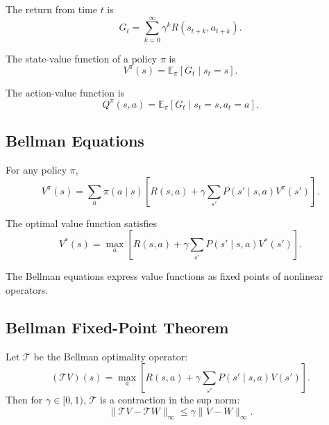 \begin{definition}[Return]
The return from time $t$ is
\[
G_t = \sum_{k=0}^{\infty} \gamma^k R(s_{t+k}, a_{t+k}).
\]
\end{definition}

\begin{definition}
The state-value function of a policy $\pi$ is
\[
V^\pi(s) = \mathbb{E}_\pi[G_t \mid s_t = s].
\]
\end{definition}

\begin{definition}
The action-value function is
\[
Q^\pi(s,a) = \mathbb{E}_\pi[G_t \mid s_t = s, a_t = a].
\]
\end{definition}

\subsection{Bellman Equations}

\begin{proposition}
For any policy $\pi$,
\[
V^\pi(s) = \sum_a \pi(a \mid s)
\left[
R(s,a) + \gamma \sum_{s'} P(s' \mid s,a) V^\pi(s')
\right].
\]
\end{proposition}

\begin{proposition}
The optimal value function satisfies
\[
V^*(s) = \max_a
\left[
R(s,a) + \gamma \sum_{s'} P(s' \mid s,a) V^*(s')
\right].
\]
\end{proposition}

\begin{remark}
The Bellman equations express value functions as fixed points of nonlinear operators.
\end{remark}

\subsection{Bellman Fixed-Point Theorem}

\begin{theorem}
Let $\mathcal{T}$ be the Bellman optimality operator:
\[
(\mathcal{T}V)(s)
= \max_a \left[ R(s,a) + \gamma \sum_{s'} P(s' \mid s,a) V(s') \right].
\]
Then for $\gamma \in [0,1)$, $\mathcal{T}$ is a contraction in the sup norm:
\[
\|\mathcal{T}V - \mathcal{T}W\|_\infty
\le \gamma \|V - W\|_\infty.
\]
\end{theorem}

